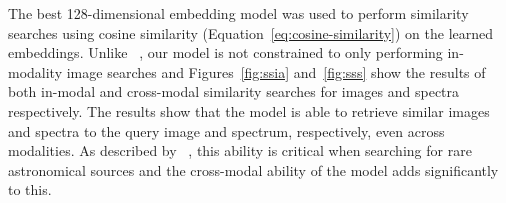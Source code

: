 The best 128-dimensional embedding model was used to perform similarity searches using cosine similarity
(Equation~\eqref{eq:cosine-similarity}) on the learned embeddings.
Unlike ~\cite{stein2021}, our model is not constrained to only performing in-modality image searches and Figures~\eqref{fig:ssia}
and~\eqref{fig:sss} show the results of both in-modal and cross-modal similarity searches for images and spectra respectively.
The results show that the model is able to retrieve similar images and spectra to the query image and spectrum, respectively,
even across modalities.
As described by ~\cite{stein2021}, this ability is critical when searching for rare astronomical sources and the cross-modal
ability of the model adds significantly to this.
